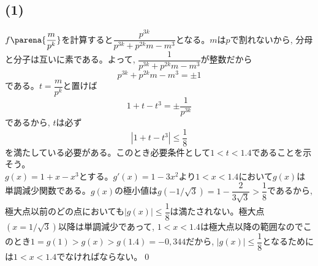 \subsection*{(1)}
$f\parena{\dfrac{m}{p^{k}}}$を計算すると$\dfrac{p^{3k}}{p^{3k} + p^{2k}m - m^3}$となる。$m$は$p$で割れないから, 分母と分子は互いに素である。よって, $\dfrac{1}{p^{3k} + p^{2k} m - m^{3}}$が整数だから
\[p^{3k} + p^{2k}m - m^{3} = \pm 1\]
である。$t= \dfrac{m}{p^{k}}$と置けば
\[ 1 + t - t^{3} = \pm \dfrac{1}{p^{3k}} \]
であるから, $t$は必ず
\[|1 + t-t^{3}| \leq \dfrac{1}{8}\]
を満たしている必要がある。このとき必要条件として$1<t<1.4$であることを示そう。\\
$g(x)=1+x-x^{3}$とする。$g'(x) = 1-3x^{2}$より$1<x<1.4$において$g(x)$は単調減少関数である。$g(x)$の極小値は$g(-1/\sqrt{3}) = 1-\dfrac{2}{3\sqrt{3}} > \dfrac{1}{8}$であるから, 極大点以前のどの点においても$|g(x)| \leq \dfrac{1}{8}$は満たされない。極大点$(x=1/\sqrt{3})$以降は単調減少であって, $1<x<1.4$は極大点以降の範囲なのでこのとき$1=g(1) > g(x) > g(1.4) = -0,344$だから, $|g(x)|\leq \dfrac{1}{8} $となるためには$1<x<1.4$でなければならない。\qed
